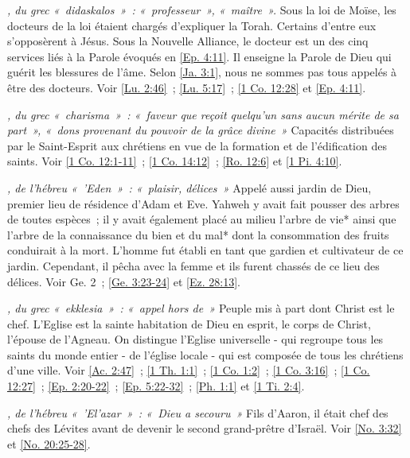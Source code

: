 \begin{multicols}{2}
\textit{, du grec «~didaskalos~»~: «~professeur~», «~maître~».}\newline
Sous la loi de Moïse, les docteurs de la loi étaient chargés d'expliquer la Torah. Certains d'entre eux s'opposèrent à Jésus. Sous la Nouvelle Alliance, le docteur est un des cinq services liés à la Parole évoqués en \vref{Ep. 4:11}. Il enseigne la Parole de Dieu qui guérit les blessures de l'âme. Selon \vref{Ja. 3:1}, nous ne sommes pas tous appelés à être des docteurs. Voir \vref{Lu. 2:46}~; \vref{Lu. 5:17}~; \vref{1 Co. 12:28} et \vref{Ep. 4:11}.

\textit{, du grec «~charisma~»~: «~faveur que reçoit quelqu'un sans aucun mérite de sa part~», «~dons provenant du pouvoir de la grâce divine~»}\newline
Capacités distribuées par le Saint-Esprit aux chrétiens en vue de la formation et de l'édification des saints. Voir \vref{1 Co. 12:1-11}~; \vref{1 Co. 14:12}~; \vref{Ro. 12:6} et \vref{1 Pi. 4:10}.

\textit{, de l'hébreu «~'Eden~»~: «~plaisir, délices~»}\newline
Appelé aussi jardin de Dieu, premier lieu de résidence d'Adam et Eve. Yahweh y avait fait pousser des arbres de toutes espèces~; il y avait également placé au milieu l'arbre de vie* ainsi que l'arbre de la connaissance du bien et du mal* dont la consommation des fruits conduirait à la mort. L'homme fut établi en tant que gardien et cultivateur de ce jardin. Cependant, il pêcha avec la femme et ils furent chassés de ce lieu des délices. Voir Ge. 2~; \vref{Ge. 3:23-24} et \vref{Ez. 28:13}.

\textit{, du grec «~ekklesia~»~: «~appel hors de~»}\newline
Peuple mis à part dont Christ est le chef. L'Eglise est la sainte habitation de Dieu en esprit, le corps de Christ, l'épouse de l'Agneau. On distingue l'Eglise universelle - qui regroupe tous les saints du monde entier - de l'église locale - qui est composée de tous les chrétiens d'une ville. Voir \vref{Ac. 2:47}~; \vref{1 Th. 1:1}~; \vref{1 Co. 1:2}~; \vref{1 Co. 3:16}~; \vref{1 Co. 12:27}~; \vref{Ep. 2:20-22}~; \vref{Ep. 5:22-32}~; \vref{Ph. 1:1} et \vref{1 Ti. 2:4}.

\textit{, de l'hébreu «~'El'azar~»~: «~Dieu a secouru~»}\newline
Fils d'Aaron, il était chef des chefs des Lévites avant de devenir le second grand-prêtre d'Israël. Voir \vref{No. 3:32} et \vref{No. 20:25-28}.


\end{multicols}
